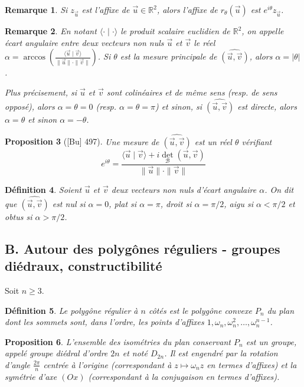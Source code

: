 \documentclass[10pt, a4paper, parskip=full, twoside, twocolumn]{report}
\newtheorem{definition}{Définition}
\newtheorem{proposition}[definition]{Proposition}
\newtheorem{remark}[definition]{Remarque}
\newcommand{\IR}{\mathbb{R}}
\begin{document}
\begin{remark}
	Si $z_{\overrightarrow{u}}$ est l'affixe de $\overrightarrow{u}\in\IR^2$, alors l'affixe de $r_{\theta}(\overrightarrow{u})$ est $e^{i\theta}z_{\overrightarrow{u}}$.
\end{remark}

\begin{remark}
	En notant $\langle\cdot \mid \cdot \rangle$ le produit scalaire euclidien de $\IR^2$, on appelle \emph{écart angulaire} entre 
	deux vecteurs non nuls $\overrightarrow{u}$ et $\overrightarrow{v}$ le réel $\alpha= \arccos\left(\frac{\langle\overrightarrow{u}\mid\overrightarrow{v}\rangle}{\|\overrightarrow{u}\|\cdot\|\overrightarrow{v}\|}\right)$.
	Si $\theta$ est la mesure principale de $\widehat{(\overrightarrow{u}, \overrightarrow{v})}$, alors $\alpha = |\theta |$.

	Plus précisement, si $\overrightarrow{u}$ et $\overrightarrow{v}$ sont colinéaires et de même sens (resp. de sens opposé), alors $\alpha = \theta = 0$ 
	(resp. $\alpha = \theta = \pi$) et sinon, si $\widehat{(\overrightarrow{u}, \overrightarrow{v})}$ est directe, alors $\alpha = \theta$ et sinon $\alpha = -\theta$.
\end{remark}

\begin{proposition}[\textnormal{[Bu] 497}]
	Une mesure de $\widehat{(\overrightarrow{u},\overrightarrow{v})}$ est un réel $\theta$ vérifiant 
	$$e^{i\theta} = \frac{\langle\overrightarrow{u}\mid \overrightarrow{v}\rangle + i\det_{\mathcal{B}}(\overrightarrow{u},\overrightarrow{v})}{\|\overrightarrow{u}\|\cdot\|\overrightarrow{v}\|}$$
\end{proposition}

\begin{definition}
	Soient $\overrightarrow{u}$ et $\overrightarrow{v}$ deux vecteurs non nuls d'écart angulaire $\alpha$.
	On dit que $\widehat{(\overrightarrow{u},\overrightarrow{v})}$ est \emph{nul} si $\alpha = 0$, \emph{plat} si $\alpha = \pi$, \emph{droit} si $\alpha = \pi/2$, \emph{aigu} si $\alpha < \pi/2$ et \emph{obtus} si $\alpha > \pi/2$.
\end{definition}

\subsection*{B. Autour des polygônes réguliers - groupes diédraux, constructibilité}
Soit $n \geq 3$.
\begin{definition}
	Le \emph{polygône régulier à $n$ côtés} est le polygône convexe $P_n$ du plan dont les sommets sont, dans l'ordre, les points d'affixes $1, \omega_n,\omega_n^2,\dots,\omega_n^{n-1}$.
\end{definition}
\begin{proposition}
	L'ensemble des isométries du plan conservant $P_n$ est un groupe, appelé \emph{groupe diédral d'ordre $2n$} et noté $D_{2n}$.
	Il est engendré par la rotation d'angle $\frac{2\pi}{n}$ centrée à l'origine (correspondant à $z\mapsto \omega_nz$ en termes d'affixes) et la symétrie d'axe $(Ox)$ (correspondant à la conjugaison en termes d'affixes).
\end{proposition}
\end{document}
